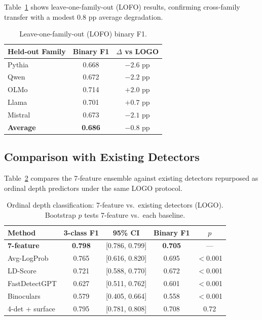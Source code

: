 \documentclass[11pt,a4paper]{article}
\begin{document}
Table~\ref{tab:lofo} shows leave-one-family-out (LOFO) results, confirming cross-family transfer with a modest 0.8 pp average degradation.

\begin{table}[t]
\centering
\small
\caption{Leave-one-family-out (LOFO) binary F1.}
\label{tab:lofo}
\begin{tabular}{lcc}
\toprule
Held-out Family & Binary F1 & $\Delta$ vs LOGO \\
\midrule
Pythia & 0.668 & $-2.6$ pp \\
Qwen & 0.672 & $-2.2$ pp \\
OLMo & 0.714 & $+2.0$ pp \\
Llama & 0.701 & $+0.7$ pp \\
Mistral & 0.673 & $-2.1$ pp \\
\midrule
\textbf{Average} & \textbf{0.686} & $\mathbf{-0.8}$ pp \\
\bottomrule
\end{tabular}
\end{table}

\subsection{Comparison with Existing Detectors}

Table~\ref{tab:baseline} compares the 7-feature ensemble against existing detectors repurposed as ordinal depth predictors under the same LOGO protocol.

\begin{table}[t]
\centering
\small
\caption{Ordinal depth classification: 7-feature vs.\ existing detectors (LOGO). Bootstrap $p$ tests 7-feature vs.\ each baseline.}
\label{tab:baseline}
\begin{tabular}{lcccc}
\toprule
Method & 3-class F1 & 95\% CI & Binary F1 & $p$ \\
\midrule
\textbf{7-feature} & \textbf{0.798} & [0.786, 0.799] & \textbf{0.705} & --- \\
Avg-LogProb & 0.765 & [0.616, 0.820] & 0.695 & $<$0.001 \\
LD-Score & 0.721 & [0.588, 0.770] & 0.672 & $<$0.001 \\
FastDetectGPT & 0.627 & [0.511, 0.762] & 0.601 & $<$0.001 \\
Binoculars & 0.579 & [0.405, 0.664] & 0.558 & $<$0.001 \\
4-det + surface & 0.795 & [0.781, 0.808] & 0.708 & 0.72 \\
\bottomrule
\end{tabular}
\end{table}
\end{document}
